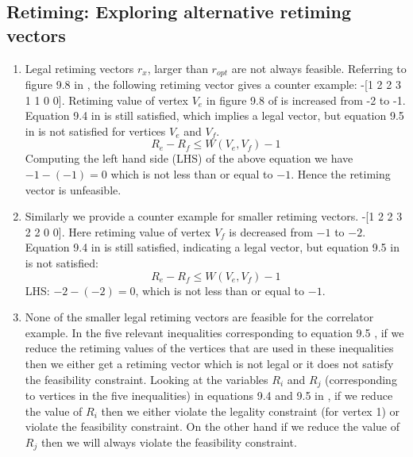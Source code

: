 \documentclass{acm_proc_article-sp}
\begin{document}
\subsection{Retiming: Exploring alternative retiming vectors}

\begin{enumerate}
  \item Legal retiming vectors $r_{x}$, larger than $r_{opt}$ are not always
    feasible.
    Referring to figure 9.8 in \cite{dm}, the following retiming vector gives a counter example:
    -[1 2 2 3 1 1 0 0]. Retiming value of vertex $V_{e}$ in figure 9.8 of \cite{dm}
    is increased from -2 to -1. Equation 9.4 in \cite{dm} is still satisfied, which implies
    a legal vector, but equation 9.5 in \cite{dm} is not satisfied for vertices $V_{e}$ and $V_{f}$.
    \begin{equation}
      R_{e} - R_{f} \leq W(V_{e}, V_{f}) - 1
    \end{equation}
    Computing the left hand side (LHS) of the above equation we have
    $-1 - (-1) = 0$ which is not less than or equal to $-1$. Hence the
    retiming vector is unfeasible.

  \item Similarly we provide a counter example for smaller retiming vectors.
    -[1 2 2 3 2 2 0 0]. Here retiming value of vertex $V_{f}$ is decreased
    from $-1$ to $-2$. Equation 9.4 in \cite{dm} is still satisfied, indicating a legal
    vector, but equation 9.5 in \cite{dm} is not satisfied:
    \begin{equation}
      R_{e} - R_{f} \leq W(V_{e}, V_{f}) - 1
    \end{equation}
    LHS: $-2 - (-2) = 0$, which is not less than or equal to $-1$.

  \item None of the smaller legal retiming vectors are feasible for the correlator
    example. In the five relevant inequalities corresponding to equation 9.5 \cite{dm},
    if we reduce the retiming values of the vertices that are used in these
    inequalities then we either get a retiming vector which is not legal or
    it does not satisfy the feasibility constraint.
    Looking at the variables $R_{i}$ and $R_{j}$ (corresponding to vertices in the
    five inequalities) in equations 9.4 and 9.5 in \cite{dm}, if we reduce the value of $R_{i}$
    then we either violate the legality constraint (for vertex 1) or violate the
    feasibility constraint. On the other hand if we reduce the value of $R_{j}$ then
    we will always violate the feasibility constraint.
\end{enumerate}
\end{document}
